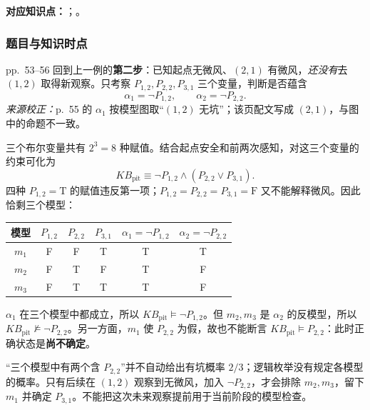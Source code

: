 
\textbf{对应知识点：}；。

\subsubsection*{题目与知识时点}

pp.~53--56 回到上一例的\textbf{第二步}：已知起点无微风、$(2,1)$ 有微风，\emph{还没有}去 $(1,2)$ 取得新观察。只考察 $P_{1,2},P_{2,2},P_{3,1}$ 三个变量，判断是否蕴含
\[
  \alpha_1=\neg P_{1,2},\qquad\alpha_2=\neg P_{2,2}.
\]
\textit{来源校正：}p.~55 的 $\alpha_1$ 按模型图取“$(1,2)$ 无坑”；该页配文写成 $(2,1)$，与图中的命题不一致。

\begin{workedsolution}
三个布尔变量共有 $2^3=8$ 种赋值。结合起点安全和前两次感知，对这三个变量的约束可化为
\[
  KB_{\mathrm{pit}}\equiv\neg P_{1,2}\land(P_{2,2}\lor P_{3,1}).
\]
四种 $P_{1,2}=\mathrm{T}$ 的赋值违反第一项；$P_{1,2}=P_{2,2}=P_{3,1}=\mathrm{F}$ 又不能解释微风。因此恰剩三个模型：

\begin{center}
\begin{tabular}{@{}cccccc@{}}
  \toprule
  模型 & $P_{1,2}$ & $P_{2,2}$ & $P_{3,1}$ & $\alpha_1=\neg P_{1,2}$ & $\alpha_2=\neg P_{2,2}$ \\
  \midrule
  $m_1$ & F & F & T & T & T \\
  $m_2$ & F & T & F & T & F \\
  $m_3$ & F & T & T & T & F \\
  \bottomrule
\end{tabular}
\end{center}

$\alpha_1$ 在三个模型中都成立，所以 $KB_{\mathrm{pit}}\models\neg P_{1,2}$。但 $m_2,m_3$ 是 $\alpha_2$ 的反模型，所以 $KB_{\mathrm{pit}}\not\models\neg P_{2,2}$。另一方面，$m_1$ 使 $P_{2,2}$ 为假，故也不能断言 $KB_{\mathrm{pit}}\models P_{2,2}$：此时正确状态是\textbf{尚不确定}。

“三个模型中有两个含 $P_{2,2}$”并不自动给出有坑概率 $2/3$；逻辑枚举没有规定各模型的概率。只有后续在 $(1,2)$ 观察到无微风，加入 $\neg P_{2,2}$，才会排除 $m_2,m_3$，留下 $m_1$ 并确定 $P_{3,1}$。不能把这次未来观察提前用于当前阶段的模型检查。
\end{workedsolution}
